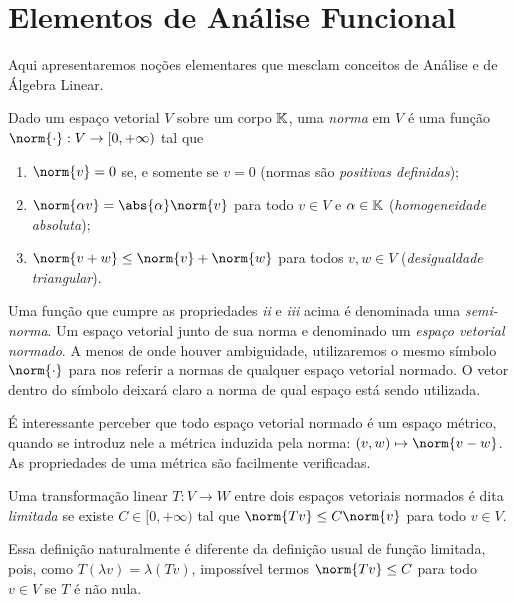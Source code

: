 
\section{Elementos de Análise Funcional}
\label{app: func anal}

Aqui apresentaremos noções elementares que mesclam conceitos de Análise e de Álgebra Linear.

\begin{defn}
    Dado um espaço vetorial \( V \) sobre um corpo \( \mathbb{K} \), uma \emph{norma} em \( V \) é uma função \( \norm{ \cdot } : V \to [0, +\infty) \) tal que
    \begin{enumerate}[label=\roman*)]
        \item \( \norm{ v } = 0 \) se, e somente se \( v = 0 \) (normas são \emph{positivas definidas});
        \item \( \norm{ \alpha v } = \abs{ \alpha } \norm{ v } \) para todo \( v \in V \) e \( \alpha \in \mathbb{K} \) (\emph{homogeneidade absoluta});
        \item \( \norm{ v + w } \leq \norm{ v } + \norm{ w } \) para todos \( v, w \in V \) (\emph{desigualdade triangular}).
    \end{enumerate}
\end{defn}
Uma função que cumpre as propriedades \emph{ii} e \emph{iii} acima é denominada uma \emph{semi-norma}.
Um espaço vetorial junto de sua norma e denominado um \emph{espaço vetorial normado}.
A menos de onde houver ambiguidade, utilizaremos o mesmo símbolo \( \norm{ \cdot } \) para nos referir a normas de qualquer espaço vetorial normado.
O vetor dentro do símbolo deixará claro a norma de qual espaço está sendo utilizada.

É interessante perceber que todo espaço vetorial normado é um espaço métrico, quando se introduz nele a métrica induzida pela norma: \( (v, w) \mapsto \norm{ v - w } \).
As propriedades de uma métrica são facilmente verificadas.

\begin{defn}
    Uma transformação linear \( T : V \to W \) entre dois espaços vetoriais normados é dita \emph{limitada} se existe \( C \in [0, +\infty) \) tal que \( \norm{ Tv } \leq C \norm{ v } \) para todo \( v \in V \).
\end{defn}
Essa definição naturalmente é diferente da definição usual de função limitada, pois, como \( T(\lambda v) = \lambda (Tv) \), impossível termos \( \norm{ Tv } \leq C \) para todo \( v \in V \) se \( T \) é não nula.

